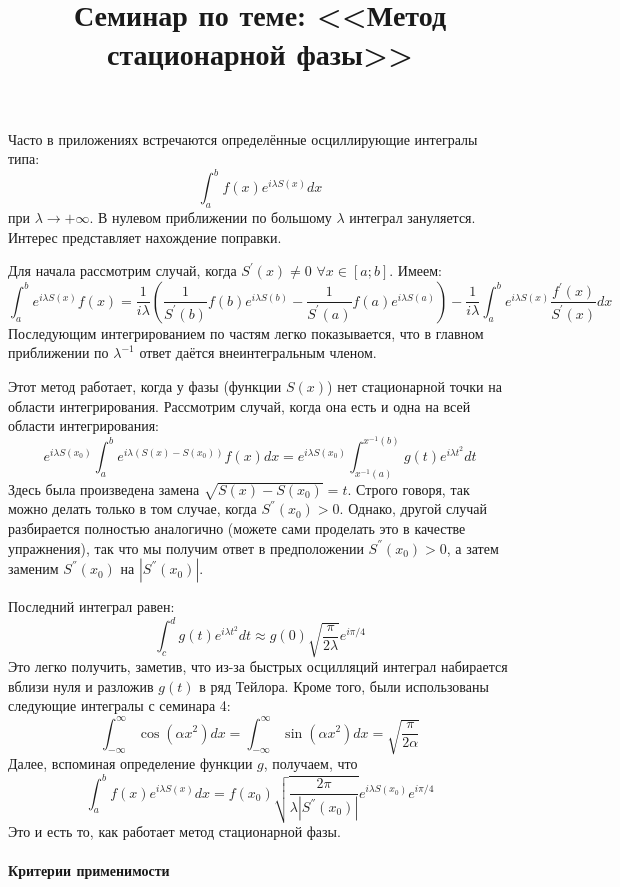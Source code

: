 \documentclass[a4paper,12pt]{article}
\begin{document}
\title{Семинар по теме: <<Метод стационарной фазы>>}
\maketitle

\noindent
Часто в приложениях встречаются определённые осциллирующие интегралы
типа: 
\[
\int_{a}^{b}f(x)e^{i\lambda S(x)}dx
\]
при $\lambda\to+\infty$. В нулевом приближении по большому $\lambda$ интеграл зануляется. Интерес представляет нахождение поправки.  

\noindent
Для начала рассмотрим случай, когда $S^{'}(x)\ne0$ $\forall x\in [a;b]$. Имеем:
$$
\int_{a}^{b}e^{i\lambda S(x)}f(x)=\frac{1}{i\lambda}\left(\frac{1}{S^{'}(b)}f(b)e^{i\lambda S(b)}-\frac{1}{S^{'}(a)}f(a)e^{i\lambda S(a)}\right)-\frac{1}{i\lambda}\int_{a}^{b}e^{i\lambda S(x)}\frac{f^{'}(x)}{S^{'}(x)}dx
$$
Последующим интегрированием по частям легко показывается, что в главном приближении по $\lambda^{-1}$ ответ даётся внеинтегральным членом.

\noindent
Этот метод работает, когда у фазы (функции $S(x)$) нет стационарной точки на области интегрирования. Рассмотрим случай, когда она есть и одна на всей области интегрирования:
$$
e^{i\lambda S(x_0)}\int_{a}^{b}e^{i\lambda( S(x)-S(x_0))}f(x)dx=e^{i\lambda S(x_0)}\int_{x^{-1}(a)}^{x^{-1}(b)}g(t)e^{i\lambda t^2}dt
$$
Здесь была произведена замена $\sqrt{S(x)-S(x_0)}=t$. Строго говоря, так можно делать только в том случае, когда $S^{''}(x_0)>0$. Однако, другой случай разбирается полностью аналогично (можете сами проделать это в качестве упражнения), так что мы получим ответ в предположении $S^{''}(x_0)>0$, а затем заменим $S^{''}(x_0)$ на $|S^{''}(x_0)|$. 

\noindent
Последний интеграл равен:
$$
\int_{c}^{d}g(t)e^{i\lambda t^2}dt\approx g(0)\sqrt{\frac{\pi}{2\lambda}}e^{i\pi/4}
$$
Это легко получить, заметив, что из-за быстрых осцилляций интеграл набирается вблизи нуля и разложив $g(t)$ в ряд Тейлора. Кроме того, были использованы следующие интегралы с семинара 4:
\[
\int_{-\infty}^{\infty}\cos(\alpha x^{2})dx=\int_{-\infty}^{\infty}\sin(\alpha x^{2})dx=\sqrt{\frac{\pi}{2\alpha}}
\]
Далее, вспоминая определение функции $g$, получаем, что 
$$
\int_{a}^{b}f(x)e^{i\lambda S(x)}dx=f(x_0)\sqrt{\frac{2\pi}{\lambda |S^{''}(x_0)|}}e^{i\lambda S(x_0)}e^{i\pi/4}
$$
Это и есть то, как работает метод стационарной фазы.


\paragraph{Критерии применимости}
\end{document}
